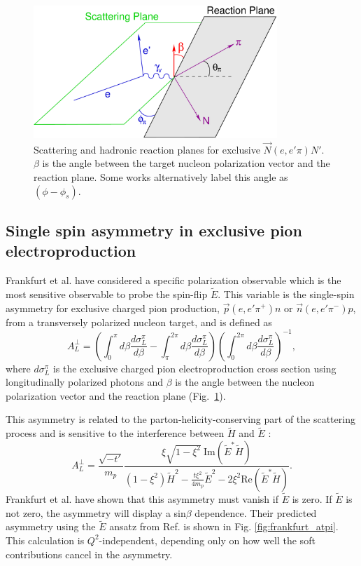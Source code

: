\begin{figure}[hbt!]
\begin{center}
\includegraphics[height=5cm]{./figures/atpi_planes.pdf}
\end{center}
\caption{\label{fig:planes}
\footnotesize{
Scattering and hadronic reaction planes for exclusive $\vec{N}(e,e'\pi)N'$.
$\beta$ is the angle between the target nucleon polarization vector and the
reaction plane.  Some works alternatively label this angle as $(\phi-\phi_s)$.
}}
\end{figure}

\subsection{Single spin asymmetry in exclusive pion electroproduction}

Frankfurt et al. \cite{Fr99} have considered a specific polarization observable
which is the most sensitive observable to probe the spin-flip $\tilde{E}$.
This variable is the single-spin asymmetry for exclusive charged pion
production, $\vec{p}(e,e'\pi^+)n$ or $\vec{n}(e,e'\pi^-)p$, from a transversely
polarized nucleon target, and is defined \cite{Be01} as
\begin{equation} \label{eqn:asy}
A_L^{\perp}=(\int^{\pi}_0 d\beta \frac{d\sigma^{\pi}_L}{d\beta} -
\int^{2\pi}_{\pi} d\beta \frac{d\sigma^{\pi}_L}{d\beta})
(\int^{2\pi}_0 d\beta \frac{d\sigma^{\pi}_L}{d\beta})^{-1},
\end{equation}
where $d\sigma^{\pi}_L$ is the exclusive charged pion electroproduction cross
section using longitudinally polarized photons and $\beta$ is the angle between
the nucleon polarization vector and the reaction plane
(Fig.~\ref{fig:planes}). 

This asymmetry is related to the parton-helicity-conserving part of the
scattering process and is sensitive to the interference between $\tilde{H}$ and
$\tilde{E}$ \cite{Fr99,Di05}:
\begin{equation}
A_L^{\perp}=\frac{\sqrt{-t'}}{m_p}
\frac{\xi\sqrt{1-\xi^2}\ \mathrm{Im}(\tilde{E}^*\tilde{H})}
{(1-\xi^2)\tilde{H}^2-\frac{t\xi^2}{4m_p}
\tilde{E}^2-2\xi^2\mathrm{Re}(\tilde{E}^*\tilde{H})}.
\end{equation}
Frankfurt et al. \cite{Fr99} have shown that this asymmetry must vanish if
$\tilde{E}$ is zero.  If $\tilde{E}$ is not zero, the asymmetry will display a
sin$\beta$ dependence.  Their predicted asymmetry using the $\tilde{E}$ ansatz
from Ref. \cite{Va99} is shown in Fig. \ref{fig:frankfurt_atpi}.  This
calculation is $Q^2$-independent, depending only on how well the soft
contributions cancel in the asymmetry.

